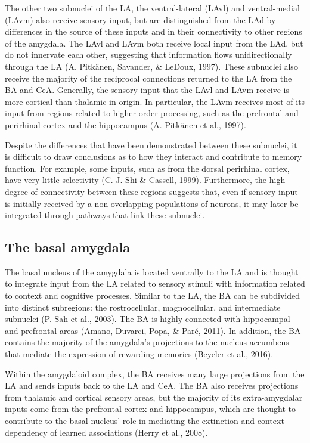 \documentclass[12pt,a4paperpaper,]{report}
\begin{document}
The other two subnuclei of the LA, the ventral-lateral (LAvl) and
ventral-medial (LAvm) also receive sensory input, but are distinguished
from the LAd by differences in the source of these inputs and in their
connectivity to other regions of the amygdala. The LAvl and LAvm both
receive local input from the LAd, but do not innervate each other,
suggesting that information flows unidirectionally through the LA (A.
Pitkänen, Savander, \& LeDoux, 1997). These subnuclei also receive the
majority of the reciprocal connections returned to the LA from the BA
and CeA. Generally, the sensory input that the LAvl and LAvm receive is
more cortical than thalamic in origin. In particular, the LAvm receives
most of its input from regions related to higher-order processing, such
as the prefrontal and perirhinal cortex and the hippocampus (A. Pitkänen
et al., 1997).

Despite the differences that have been demonstrated between these
subnuclei, it is difficult to draw conclusions as to how they interact
and contribute to memory function. For example, some inputs, such as
from the dorsal perirhinal cortex, have very little selectivity (C. J.
Shi \& Cassell, 1999). Furthermore, the high degree of connectivity
between these regions suggests that, even if sensory input is initially
received by a non-overlapping populations of neurons, it may later be
integrated through pathways that link these subnuclei.

\subsection{The basal amygdala}\label{the-basal-amygdala}

The basal nucleus of the amygdala is located ventrally to the LA and is
thought to integrate input from the LA related to sensory stimuli with
information related to context and cognitive processes. Similar to the
LA, the BA can be subdivided into distinct subregions: the
rostrocellular, magnocellular, and intermediate subnuclei (P. Sah et
al., 2003). The BA is highly connected with hippocampal and prefrontal
areas (Amano, Duvarci, Popa, \& Paré, 2011). In addition, the BA
contains the majority of the amygdala's projections to the nucleus
accumbens that mediate the expression of rewarding memories (Beyeler et
al., 2016).

Within the amygdaloid complex, the BA receives many large projections
from the LA and sends inputs back to the LA and CeA. The BA also
receives projections from thalamic and cortical sensory areas, but the
majority of its extra-amygdalar inputs come from the prefrontal cortex
and hippocampus, which are thought to contribute to the basal nucleus'
role in mediating the extinction and context dependency of learned
associations (Herry et al., 2008).
\end{document}
